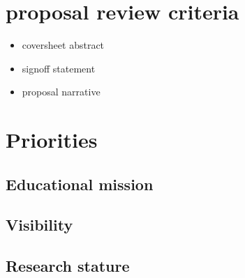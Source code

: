 \documentclass[]{article}
\begin{document}
 

\section{proposal review criteria}
\begin{itemize}
	\item coversheet abstract
	\item signoff statement %
	\item proposal narrative
\end{itemize}

\section{Priorities}
\subsection{Educational mission}

\subsection{Visibility}

\subsection{Research stature}



 


 
\newpage

\end{document}
